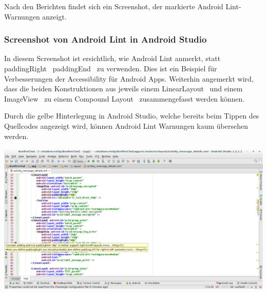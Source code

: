 Nach den Berichten findet sich ein Screenshot, der markierte Android Lint-Warnungen anzeigt.







\subsubsection{Screenshot von Android Lint in Android Studio}

In diesem Screenshot ist ersichtlich, wie Android Lint anmerkt, statt \glqq paddingRight\grqq~ \glqq paddingEnd\grqq~ zu verwenden. Dies ist ein Beispiel für Verbesserungen der Accessibility für Android Apps. Weiterhin angemerkt wird, dass die beiden Konstruktionen aus jeweils einem \glqq LinearLayout\grqq~ und einem \glqq ImageView\grqq~ zu einem \glqq Compound Layout\grqq~ zusammengefasst werden können.

Durch die gelbe Hinterlegung in Android Studio, welche bereits beim Tippen des Quellcodes angezeigt wird, können Android Lint Warnungen kaum übersehen werden.

\includegraphics[width=17.5cm]{belege/lint/android-lint-screenshot.png}


